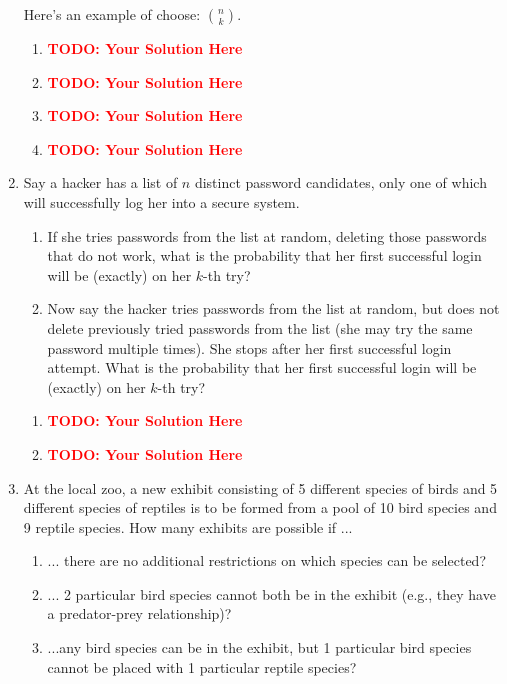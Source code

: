 \documentclass[12pt]{article}
\def\todo#1{\textcolor{red}{\textbf{#1}}}
\renewcommand{\|}{\mid}
\begin{document}
\begin{enumerate}
\begin{tcolorbox}
Here's an example of choose: $\binom{n}{k}$.

\begin{enumerate}
\item \todo{TODO: Your Solution Here}
\item \todo{TODO: Your Solution Here}
\item \todo{TODO: Your Solution Here}
\item \todo{TODO: Your Solution Here}
\end{enumerate}
\end{tcolorbox}



\item Say a hacker has a list of $n$ distinct password candidates, only one of which will successfully
log her into a secure system.
\begin{enumerate}
    \item If she tries passwords from the list at random, deleting those passwords that do not
work, what is the probability that her first successful login will be (exactly) on her $k$-th
try?
\item Now say the hacker tries passwords from the list at random, but does not delete
previously tried passwords from the list (she may try the same password multiple times). She stops after her first successful login
attempt. What is the probability that her first successful login will be (exactly) on her
$k$-th try?
\end{enumerate}

\begin{tcolorbox}
\begin{enumerate}
\item \todo{TODO: Your Solution Here}
\item \todo{TODO: Your Solution Here}
\end{enumerate}
\end{tcolorbox}


\item At the local zoo, a new exhibit consisting of 5 different species of birds and 5 different species
of reptiles is to be formed from a pool of 10 bird species and 9 reptile species. How many
exhibits are possible if ...
\begin{enumerate}
    \item ... there are no additional restrictions on which species can be selected?
    \item ... 2 particular bird species cannot both be in the exhibit (e.g., they have a predator-prey relationship)?
    \item ...any bird species can be in the exhibit, but 1 particular bird species cannot be placed with 1 particular reptile species?
\end{enumerate}



\end{enumerate}
\end{document}
